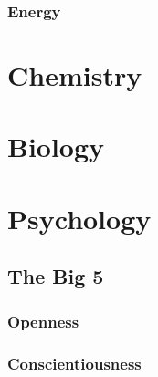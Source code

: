 \documentclass{article}
\begin{document}
\newpage

\subsubsection{Energy}

\newpage 











\section{Chemistry} 

\newpage 













\section{Biology} 

\newpage 













\section{Psychology} 

\newpage 

\subsection{The Big 5}

\subsubsection{Openness}

\newpage 

\subsubsection{Conscientiousness} 

\newpage 
\end{document}
